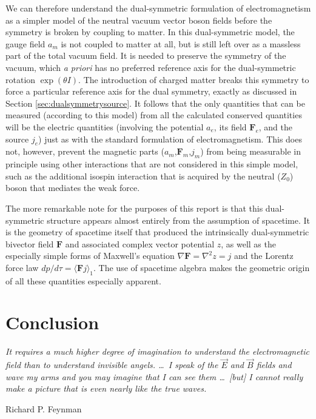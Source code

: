 \documentclass[1p,sort&compress]{elsarticle}
\numberwithin{equation}{section}
\newcommand{\rv}[1]{\vec{#1}}
\newcommand{\bv}[1]{\mathbf{#1}}
\newcommand{\mean}[1]{\langle #1 \rangle}
\newcommand\epigraph[3]{
\vspace{1em}\hfill{}\begin{minipage}{#1}{\begin{spacing}{0.9}
\small\noindent\textit{#2}\end{spacing}
\vspace{1em}
\hfill{}{#3}}\vspace{2em}
\end{minipage}}
\begin{document}
We can therefore understand the dual-symmetric formulation of electromagnetism as a simpler model of the neutral vacuum vector boson fields before the symmetry is broken by coupling to matter.  In this dual-symmetric model, the gauge field $a_m$ is not coupled to matter at all, but is still left over as a massless part of the total vacuum field.  It is needed to preserve the symmetry of the vacuum, which \emph{a priori} has no preferred reference axis for the dual-symmetric rotation $\exp(\theta I)$.  The introduction of charged matter breaks this symmetry to force a particular reference axis for the dual symmetry, exactly as discussed in Section \ref{sec:dualsymmetrysource}.  It follows that the only quantities that can be measured (according to this model) from all the calculated conserved quantities will be the electric quantities (involving the potential $a_e$, its field $\bv{F}_e$, and the source $j_e$) just as with the standard formulation of electromagnetism.  This does not, however, prevent the magnetic parts ($a_m$,$\bv{F}_m$,$j_m$) from being measurable in principle using other interactions that are not considered in this simple model, such as the additional isospin interaction that is acquired by the neutral ($Z_0$) boson that mediates the weak force.

The more remarkable note for the purposes of this report is that this dual-symmetric structure appears almost entirely from the assumption of spacetime.  It is the geometry of spacetime itself that produced the intrinsically dual-symmetric bivector field $\bv{F}$ and associated complex vector potential $z$, as well as the especially simple forms of Maxwell's equation $\nabla \bv{F} = \nabla^2 z = j$ and the Lorentz force law $dp/d\tau = \mean{\bv{F}j}_1$.  The use of spacetime algebra makes the geometric origin of all these quantities especially apparent.


\clearpage

\section{Conclusion}\label{sec:conclusion}

\epigraph{4.5in}{It requires a much higher degree of imagination to understand the electromagnetic field than to understand invisible angels. \ldots~I speak of the $\rv{E}$ and $\rv{B}$ fields and wave my arms and you may imagine that I can see them \ldots~[but] I cannot really make a picture that is even nearly like the true waves.}{Richard P. Feynman \cite{Feynman1964}}
\end{document}
